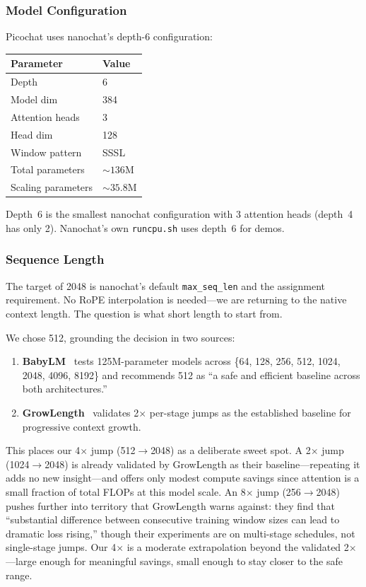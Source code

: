 \subsubsection{Model Configuration}

Picochat uses nanochat's depth-6 configuration:

\begin{table}[H]
\centering\small
\begin{tabular}{@{}ll@{}}
\toprule
Parameter & Value \\
\midrule
Depth & 6 \\
Model dim & 384 \\
Attention heads & 3 \\
Head dim & 128 \\
Window pattern & SSSL \\
Total parameters & ${\sim}136$M \\
Scaling parameters & ${\sim}35.8$M \\
\bottomrule
\end{tabular}
\end{table}

Depth~6 is the smallest nanochat configuration with 3 attention heads (depth~4 has only 2). Nanochat's own \texttt{runcpu.sh} uses depth~6 for demos.

\subsubsection{Sequence Length}

The target of 2048 is nanochat's default \texttt{max\_seq\_len} and the assignment requirement. No RoPE interpolation is needed---we are returning to the native context length. The question is what short length to start from.

We chose 512, grounding the decision in two sources:

\begin{enumerate}
  \item \textbf{BabyLM}~\cite{babyslen} tests 125M-parameter models across \{64, 128, 256, 512, 1024, 2048, 4096, 8192\} and recommends 512 as ``a safe and efficient baseline across both architectures.''
  \item \textbf{GrowLength}~\cite{growlength} validates 2$\times$ per-stage jumps as the established baseline for progressive context growth.
\end{enumerate}

This places our 4$\times$ jump (512$\to$2048) as a deliberate sweet spot. A 2$\times$ jump (1024$\to$2048) is already validated by GrowLength as their baseline---repeating it adds no new insight---and offers only modest compute savings since attention is a small fraction of total FLOPs at this model scale. An 8$\times$ jump (256$\to$2048) pushes further into territory that GrowLength warns against: they find that ``substantial difference between consecutive training window sizes can lead to dramatic loss rising,'' though their experiments are on multi-stage schedules, not single-stage jumps. Our 4$\times$ is a moderate extrapolation beyond the validated 2$\times$---large enough for meaningful savings, small enough to stay closer to the safe range.

